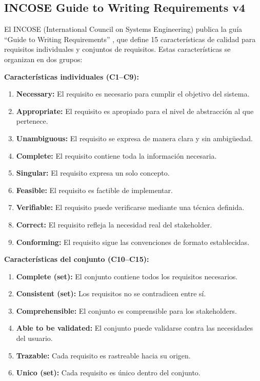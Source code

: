 \subsection{INCOSE Guide to Writing Requirements v4}
\label{sec:incose}

El INCOSE (International Council on Systems Engineering) publica la guía ``Guide to Writing Requirements'' \cite{incose}, que define 15 características de calidad para requisitos individuales y conjuntos de requisitos. Estas características se organizan en dos grupos:

\textbf{Características individuales (C1--C9):}
\begin{enumerate}
  \item[C1.] \textbf{Necessary:} El requisito es necesario para cumplir el objetivo del sistema.
  \item[C2.] \textbf{Appropriate:} El requisito es apropiado para el nivel de abstracción al que pertenece.
  \item[C3.] \textbf{Unambiguous:} El requisito se expresa de manera clara y sin ambigüedad.
  \item[C4.] \textbf{Complete:} El requisito contiene toda la información necesaria.
  \item[C5.] \textbf{Singular:} El requisito expresa un solo concepto.
  \item[C6.] \textbf{Feasible:} El requisito es factible de implementar.
  \item[C7.] \textbf{Verifiable:} El requisito puede verificarse mediante una técnica definida.
  \item[C8.] \textbf{Correct:} El requisito refleja la necesidad real del stakeholder.
  \item[C9.] \textbf{Conforming:} El requisito sigue las convenciones de formato establecidas.
\end{enumerate}

\textbf{Características del conjunto (C10--C15):}
\begin{enumerate}
  \item[C10.] \textbf{Complete (set):} El conjunto contiene todos los requisitos necesarios.
  \item[C11.] \textbf{Consistent (set):} Los requisitos no se contradicen entre sí.
  \item[C12.] \textbf{Comprehensible:} El conjunto es comprensible para los stakeholders.
  \item[C13.] \textbf{Able to be validated:} El conjunto puede validarse contra las necesidades del usuario.
  \item[C14.] \textbf{Trazable:} Cada requisito es rastreable hacia su origen.
  \item[C15.] \textbf{Unico (set):} Cada requisito es único dentro del conjunto.
\end{enumerate}

